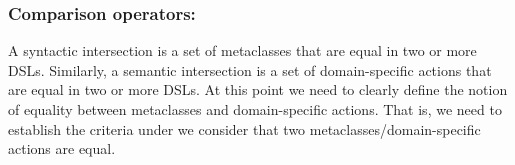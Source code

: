 






\subsubsection{Comparison operators:} A syntactic intersection is a set of metaclasses that are equal in two or more DSLs. Similarly, a semantic intersection is a set of domain-specific actions that are equal in two or more DSLs. At this point we need to clearly define the notion of equality between metaclasses and domain-specific actions. That is, we need to establish the criteria under we consider that two metaclasses/domain-specific actions are equal.

